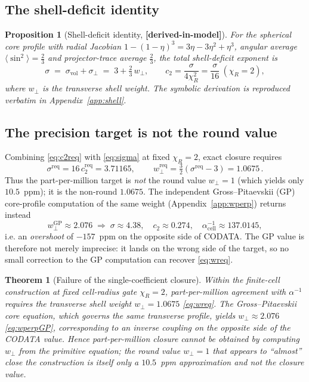 \documentclass[11pt,a4paper]{article}
\newtheorem{theorem}{Theorem}
\newtheorem{proposition}{Proposition}
\theoremstyle{definition}
\newcommand{\derivedmodel}{\textbf{[derived-in-model]}}
\begin{document}
\subsection*{The shell-deficit identity}
\begin{proposition}[Shell-deficit identity, \derivedmodel{}]
\label{prop:sigma}
For the spherical core profile with radial Jacobian
$1-(1-\eta)^3 = 3\eta-3\eta^2+\eta^3$, angular average
$\langle\sin^2\rangle=\tfrac23$ and projector-trace average $\tfrac23$, the total
shell-deficit exponent is
\begin{equation}
  \sigma \;=\; \sigma_{\mathrm{vol}} + \sigma_\perp
        \;=\; 3 + \tfrac{2}{3}\,w_\perp,
  \qquad
  c_2=\frac{\sigma}{4\chi_R^2}=\frac{\sigma}{16}\ (\chi_R=2),
  \label{eq:sigma}
\end{equation}
where $w_\perp$ is the transverse shell weight. The symbolic derivation is
reproduced verbatim in Appendix~\ref{app:shell}.
\end{proposition}

\subsection*{The precision target is not the round value}
Combining \eqref{eq:c2req} with \eqref{eq:sigma} at fixed $\chi_R=2$, exact
closure requires
\begin{equation}
  \sigma^{\mathrm{req}}=16\,c_2^{\mathrm{req}}=3.71165,
  \qquad
  \boxed{\,w_\perp^{\mathrm{req}}=\tfrac32(\sigma^{\mathrm{req}}-3)=1.0675\,}.
  \label{eq:wreq}
\end{equation}
Thus the part-per-million target is \emph{not} the round value $w_\perp=1$ (which
yields only $10.5$~ppm); it is the non-round $1.0675$. The independent
Gross--Pitaevskii (GP) core-profile computation of the same weight
(Appendix~\ref{app:wperp}) returns instead
\begin{equation}
  w_\perp^{\mathrm{GP}} \approx 2.076
  \;\Longrightarrow\;
  \sigma\approx4.38,\quad c_2\approx0.274,\quad
  \alpha^{-1}_{\mathrm{cell}}\approx137.0145,
  \label{eq:wperpGP}
\end{equation}
i.e. an \emph{overshoot} of $-157$~ppm on the opposite side of CODATA. The GP
value is therefore not merely imprecise: it lands on the wrong side of the target,
so no small correction to the GP computation can recover \eqref{eq:wreq}.

\begin{theorem}[Failure of the single-coefficient closure]
\label{thm:obstruction}
Within the finite-cell construction at fixed cell-radius gate $\chi_R=2$,
part-per-million agreement with $\alpha^{-1}$ requires the transverse shell weight
$w_\perp=1.0675$ \eqref{eq:wreq}. The Gross--Pitaevskii core equation, which
governs the same transverse profile, yields $w_\perp\approx2.076$
\eqref{eq:wperpGP}, corresponding to an inverse coupling on the opposite side of
the CODATA value. Hence part-per-million closure cannot be obtained by computing
$w_\perp$ from the primitive equation; the round value $w_\perp=1$ that appears to
``almost'' close the construction is itself only a $10.5$~ppm approximation and
not the closure value.
\end{theorem}
\end{document}
